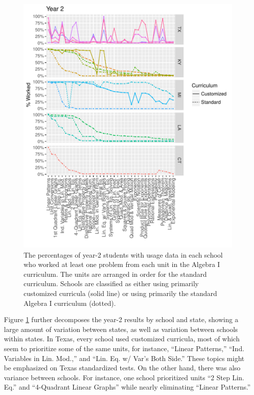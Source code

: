 \documentclass[12pt]{article}\usepackage[]{graphicx}\usepackage[]{color}
\makeatletter
\def\maxwidth{ %
  \ifdim\Gin@nat@width>\linewidth
    \linewidth
  \else
    \Gin@nat@width
  \fi
}
\makeatother
\begin{document}
\begin{figure}
  \centering

\includegraphics[width=\maxwidth]{figure/unitsBySchool-1} 

\caption{The percentages of year-2 students with usage data in each
  school who worked at least one problem from each unit in the Algebra I curriculum. The
  units are arranged in order for the standard curriculum. Schools are
  classified as either using primarily customized curricula (solid
  line) or using primarily the standard Algebra I curriculum (dotted).}
\label{fig:unitsBySchool}
\end{figure}

Figure \ref{fig:unitsBySchool} further decomposes the year-2 results
by school and state, showing a large amount of variation between
states, as well as variation between schools within states.
In Texas, every school used customized curricula, most of which seem to
prioritize some of the same units, for instance, ``Linear Patterns,''
``Ind. Variables in Lin. Mod.,'' and
``Lin. Eq. w/ Var's Both Side.''
These topics might be emphasized on Texas standardized tests.
On the other hand, there was also variance between schools.
For instance, one school prioritized units ``2 Step Lin. Eq.''
and ``4-Quadrant Linear Graphs'' while nearly eliminating ``Linear Patterns.''
\end{document}
